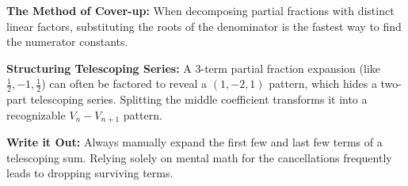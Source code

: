 \begin{takeaways}
    \item \textbf{The Method of Cover-up:} When decomposing partial fractions with distinct linear factors, substituting the roots of the denominator is the fastest way to find the numerator constants.
    \item \textbf{Structuring Telescoping Series:} A 3-term partial fraction expansion (like $\frac{1}{2}, -1, \frac{1}{2}$) can often be factored to reveal a $(1, -2, 1)$ pattern, which hides a two-part telescoping series. Splitting the middle coefficient transforms it into a recognizable $V_n - V_{n+1}$ pattern.
    \item \textbf{Write it Out:} Always manually expand the first few and last few terms of a telescoping sum. Relying solely on mental math for the cancellations frequently leads to dropping surviving terms.
\end{takeaways}

